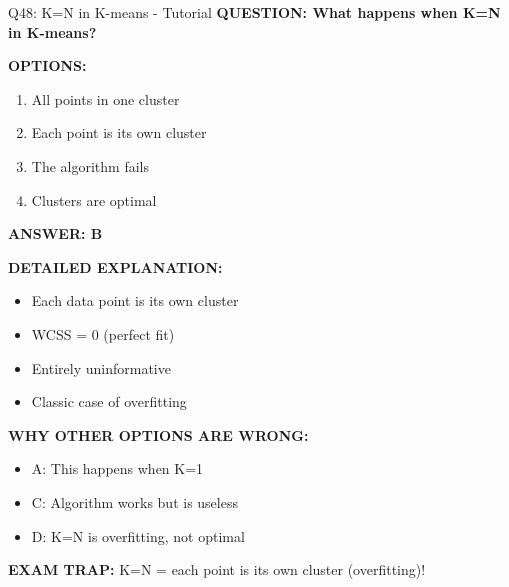 \documentclass[8pt]{beamer}
\begin{document}
	\begin{frame}{Q48: K=N in K-means - Tutorial}
		\fontsize{6.5}{7.5}\selectfont
		\textbf{QUESTION: What happens when K=N in K-means?}
		
		\vspace{0.1cm}
		\textbf{OPTIONS:}
		\begin{enumerate}
			\item All points in one cluster
			\item Each point is its own cluster
			\item The algorithm fails
			\item Clusters are optimal
		\end{enumerate}
		
		\vspace{0.1cm}
		\textcolor{myblue}{\textbf{ANSWER: B}}
		
		\vspace{0.1cm}
		\textbf{DETAILED EXPLANATION:}
		\begin{itemize}
			\item Each data point is its own cluster
			\item WCSS = 0 (perfect fit)
			\item Entirely uninformative
			\item Classic case of overfitting
		\end{itemize}
		
		\vspace{0.1cm}
		\textcolor{myred}{\textbf{WHY OTHER OPTIONS ARE WRONG:}}
		\begin{itemize}
			\item \textcolor{myred}{A:} This happens when K=1
			\item \textcolor{myred}{C:} Algorithm works but is useless
			\item \textcolor{myred}{D:} K=N is overfitting, not optimal
		\end{itemize}
		
		\textcolor{myred}{\textbf{EXAM TRAP:}} K=N = \textcolor{myblue}{each point is its own cluster} (overfitting)!
	\end{frame}
	
\end{document}
